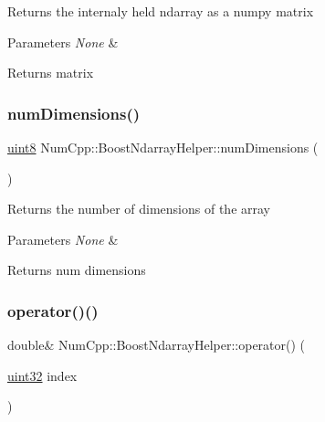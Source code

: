 Returns the internaly held ndarray as a numpy matrix


\begin{DoxyParams}{Parameters}
{\em None} & \\
\hline
\end{DoxyParams}
\begin{DoxyReturn}{Returns}
matrix 
\end{DoxyReturn}
\mbox{\label{class_num_cpp_1_1_boost_ndarray_helper_ae0d6fea21438905e49743a4daacc0a04}} 
\subsubsection{\texorpdfstring{num\+Dimensions()}{numDimensions()}}
{\footnotesize\ttfamily \mbox{\hyperlink{namespace_num_cpp_aee396d0469d6031cd18118c0a45bcdda}{uint8}} Num\+Cpp\+::\+Boost\+Ndarray\+Helper\+::num\+Dimensions (\begin{DoxyParamCaption}{ }\end{DoxyParamCaption})\hspace{0.3cm}{\ttfamily [inline]}}

Returns the number of dimensions of the array


\begin{DoxyParams}{Parameters}
{\em None} & \\
\hline
\end{DoxyParams}
\begin{DoxyReturn}{Returns}
num dimensions 
\end{DoxyReturn}
\mbox{\label{class_num_cpp_1_1_boost_ndarray_helper_a16503ef242ff43264f26e8739660af12}} 
\subsubsection{\texorpdfstring{operator()()}{operator()()}\hspace{0.1cm}{\footnotesize\ttfamily [1/3]}}
{\footnotesize\ttfamily double\& Num\+Cpp\+::\+Boost\+Ndarray\+Helper\+::operator() (\begin{DoxyParamCaption}\item[{\mbox{\hyperlink{namespace_num_cpp_a36f388e948380413c63011cab9b7fbd5}{uint32}}}]{index }\end{DoxyParamCaption})\hspace{0.3cm}{\ttfamily [inline]}}

